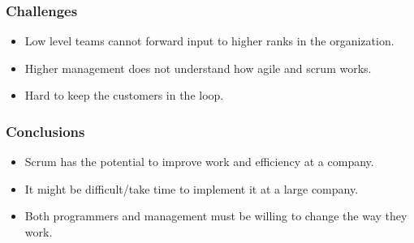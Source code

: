\documentclass{beamer}
\begin{document}
\begin{frame}
  \frametitle{Challenges}
  \begin{itemize}
  \item Low level teams cannot forward input to higher ranks in the
    organization.
  \item Higher management does not understand how agile and scrum works.
  \item Hard to keep the customers in the loop.
  \end{itemize}
\end{frame}

\begin{frame}
  \frametitle{Conclusions}
  \begin{itemize}
  \item Scrum has the potential to improve work and efficiency at a company.
  \item It might be difficult/take time to implement it at a large company.
  \item Both programmers and management must be willing to change the
    way they work.
  \end{itemize}
\end{frame}
\end{document}
